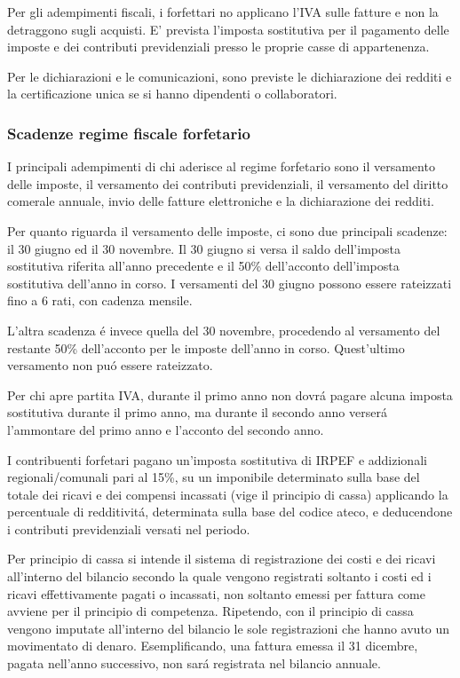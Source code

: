 \documentclass{article}
\begin{document}
Per gli adempimenti fiscali, i forfettari no applicano l'IVA sulle fatture e non la detraggono sugli acquisti. E' prevista l'imposta sostitutiva per il pagamento delle imposte e dei contributi previdenziali presso le proprie casse di appartenenza.

Per le dichiarazioni e le comunicazioni, sono previste le dichiarazione dei redditi e la certificazione unica se si hanno dipendenti o collaboratori.

\subsubsection{Scadenze regime fiscale forfetario}

I principali adempimenti di chi aderisce al regime forfetario sono il versamento delle imposte, il versamento dei contributi previdenziali, il versamento del diritto comerale annuale, 
invio delle fatture elettroniche e la dichiarazione dei redditi.

Per quanto riguarda il versamento delle imposte, ci sono due principali scadenze: il 30 giugno ed il 30 novembre.
Il 30 giugno si versa il saldo dell'imposta sostitutiva riferita all'anno precedente e il 50\% dell'acconto dell'imposta sostitutiva dell'anno in corso. I versamenti del 30 giugno possono essere rateizzati fino a 6 rati, con cadenza mensile.

L'altra scadenza \'e invece quella del 30 novembre, procedendo al versamento del restante 50\% dell'acconto per le imposte dell'anno in corso. Quest'ultimo versamento non pu\'o essere rateizzato.

Per chi apre partita IVA, durante il primo anno non dovr\'a pagare alcuna imposta sostitutiva durante il primo anno, 
ma durante il secondo anno verser\'a l'ammontare del primo anno e l'acconto del secondo anno.

I contribuenti forfetari pagano un'imposta sostitutiva di IRPEF e addizionali regionali/comunali pari al 15\%, su un imponibile determinato sulla base del totale dei ricavi e dei compensi incassati (vige il principio di cassa) applicando la percentuale di redditivit\'a,
determinata sulla base del codice ateco, e deducendone i contributi previdenziali versati nel periodo.

Per principio di cassa si intende il sistema di registrazione dei costi e dei ricavi all'interno del bilancio secondo la quale vengono registrati soltanto i costi ed i ricavi effettivamente pagati o incassati, non soltanto emessi per fattura come avviene per il principio di competenza.
Ripetendo, con il principio di cassa vengono imputate all'interno del bilancio le sole registrazioni che hanno avuto un movimentato di denaro. Esemplificando, una fattura emessa il 31 dicembre, pagata nell'anno successivo, non sar\'a registrata nel bilancio annuale.
\end{document}
